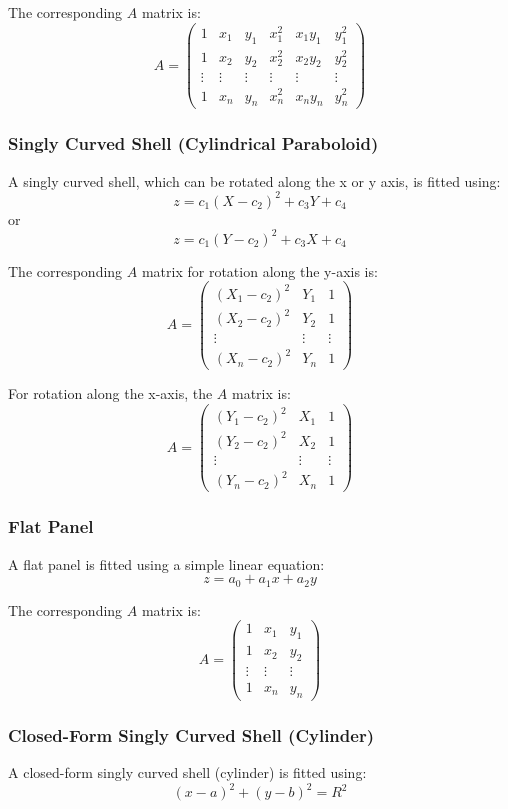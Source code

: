 \documentclass[12pt]{article}
\begin{document}
The corresponding \(A\) matrix is:
\[
A = \begin{pmatrix}
1 & x_1 & y_1 & x_1^2 & x_1 y_1 & y_1^2 \\
1 & x_2 & y_2 & x_2^2 & x_2 y_2 & y_2^2 \\
\vdots & \vdots & \vdots & \vdots & \vdots & \vdots \\
1 & x_n & y_n & x_n^2 & x_n y_n & y_n^2
\end{pmatrix}
\]

\subsubsection{Singly Curved Shell (Cylindrical Paraboloid)}
A singly curved shell, which can be rotated along the x or y axis, is fitted using:
\[
z = c_1 (X - c_2)^2 + c_3 Y + c_4
\]
or
\[
z = c_1 (Y - c_2)^2 + c_3 X + c_4
\]

The corresponding \(A\) matrix for rotation along the y-axis is:
\[
A = \begin{pmatrix}
(X_1 - c_2)^2 & Y_1 & 1 \\
(X_2 - c_2)^2 & Y_2 & 1 \\
\vdots & \vdots & \vdots \\
(X_n - c_2)^2 & Y_n & 1
\end{pmatrix}
\]

For rotation along the x-axis, the \(A\) matrix is:
\[
A = \begin{pmatrix}
(Y_1 - c_2)^2 & X_1 & 1 \\
(Y_2 - c_2)^2 & X_2 & 1 \\
\vdots & \vdots & \vdots \\
(Y_n - c_2)^2 & X_n & 1
\end{pmatrix}
\]

\subsubsection{Flat Panel}
A flat panel is fitted using a simple linear equation:
\[
z = a_0 + a_1 x + a_2 y
\]

The corresponding \(A\) matrix is:
\[
A = \begin{pmatrix}
1 & x_1 & y_1 \\
1 & x_2 & y_2 \\
\vdots & \vdots & \vdots \\
1 & x_n & y_n
\end{pmatrix}
\]

\subsubsection{Closed-Form Singly Curved Shell (Cylinder)}
A closed-form singly curved shell (cylinder) is fitted using:
\[
(x - a)^2 + (y - b)^2 = R^2
\]
\end{document}
